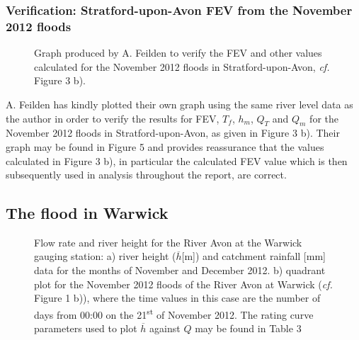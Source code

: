 \documentclass[11pt,a4paper]{article}
\begin{document}
\subsubsection{Verification: Stratford-upon-Avon FEV from the November 2012 floods}
\begin{figure}[ht!]
\centering
{}
\caption{Graph produced by A. Feilden to verify the FEV and other values calculated for the November 2012 floods in Stratford-upon-Avon, \textit{cf.} Figure 3 b).}
\end{figure}
\noindent A. Feilden has kindly plotted their own graph using the same river level data as the author in order to verify the results for FEV, $T_f$, $h_m$, $Q_T$ and $Q_m$ for the November 2012 floods in Stratford-upon-Avon, as given in Figure 3 b). Their graph may be found in Figure 5 and provides reassurance that the values calculated in Figure 3 b), in particular the calculated FEV value which is then subsequently used in analysis throughout the report, are correct.

\subsection{The flood in Warwick}
\begin{figure}[ht!]
\centering
{}
\hfill
{}
\caption{Flow rate and river height for the River Avon at the Warwick gauging station: a) river height ($\overline{h}$[m]) \cite{EA} and catchment rainfall [mm] data \cite{NRFA} for the months of November and December 2012. b) quadrant plot for the November 2012 floods of the River Avon at Warwick (\textit{cf.} Figure 1 b)), where the time values in this case are the number of days from 00:00 on the 21\textsuperscript{st} of November 2012. The rating curve parameters used to plot $\overline{h}$ against $Q$ may be found in Table 3}
\end{figure}
\end{document}
